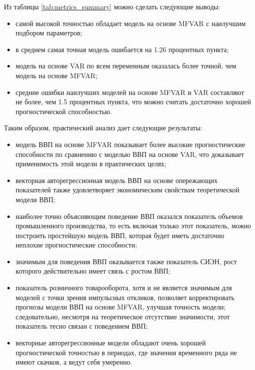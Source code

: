 \documentclass[a4paper, 14pt]{extreport}
\numberwithin{equation}{section}
\numberwithin{equation}{section}
\begin{document}
	Из таблицы \ref{tab:metrics_summary} можно сделать следующие выводы:
	\begin{itemize}
		\item самой высокой точностью обладает модель на основе MFVAR с наилучшим подбором параметров;
		\item в среднем самая точная модель ошибается на 1.26 процентных пункта;
		\item модель на основе VAR по всем переменным оказалась более точной, чем модель на основе MFVAR;
		\item средние ошибки наилучших моделей на основе MFVAR и VAR составляют не более, чем 1.5 процентных пункта, что можно считать достаточно хорошей прогностической способностью.
	\end{itemize}
	Таким образом, практический анализ дает следующие результаты:
	\begin{itemize}
		\item модель ВВП на основе MFVAR показывает более высокие прогностические способности по сравнению с моделью ВВП на основе VAR, что доказывает применимость этой модели в практических целях;
		\item векторная авторегрессионная модель ВВП на основе опережающих показателей также удовлетворяет экономическим свойствам теоретической модели ВВП;
		\item наиболее точно объясняющим поведение ВВП оказался показатель объемов промышленного производства, то есть включая только этот показатель, можно построить простейшую модель ВВП, которая будет иметь достаточно неплохие прогностические способности;
		\item значимым для поведения ВВП оказывается также показатель СИЭН, рост которого действительно имеет связь с ростом ВВП;
		\item показатель розничного товарооборота, хотя и не является значимым для моделей с точки зрения импульсных откликов, позволяет корректировать прогнозы модели ВВП на основе MFVAR, улучшая точность модели; следовательно, несмотря на теоретическое отсутствие значимости, этот показатель тесно связан с поведением ВВП;
		\item векторные авторегрессионные модели обладают очень хорошей прогностической точностью в периодах, где значения временного ряда не имеют скачков, а ведут себя умеренно.
		
	\end{itemize}
	
	\newpage
\end{document}
